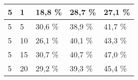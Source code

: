 \begin{table}[!htb]
\begin{tabular}{lllll}
\multicolumn{1}{|l|}{5}                                                      & \multicolumn{1}{l|}{1}                                                                 & \multicolumn{1}{l|}{18,8 \%}                                                                                           & \multicolumn{1}{l|}{28,7 \%}                                                                                            & \multicolumn{1}{l|}{27,1 \%}                                                                                            \\ \hline
\multicolumn{1}{|l|}{5}                                                      & \multicolumn{1}{l|}{5}                                                                 & \multicolumn{1}{l|}{30,6 \%}                                                                                           & \multicolumn{1}{l|}{38,9 \%}                                                                                            & \multicolumn{1}{l|}{41,7 \%}                                                                                            \\ \hline
\multicolumn{1}{|l|}{5}                                                      & \multicolumn{1}{l|}{10}                                                                & \multicolumn{1}{l|}{26,1 \%}                                                                                           & \multicolumn{1}{l|}{40,1 \%}                                                                                            & \multicolumn{1}{l|}{43,3 \%}                                                                                            \\ \hline
\multicolumn{1}{|l|}{5}                                                      & \multicolumn{1}{l|}{15}                                                                & \multicolumn{1}{l|}{30,7 \%}                                                                                           & \multicolumn{1}{l|}{40,7 \%}                                                                                            & \multicolumn{1}{l|}{47,0 \%}                                                                                            \\ \hline
\multicolumn{1}{|l|}{5}                                                      & \multicolumn{1}{l|}{20}                                                                & \multicolumn{1}{l|}{29,2 \%}                                                                                           & \multicolumn{1}{l|}{39,3 \%}                                                                                            & \multicolumn{1}{l|}{45,4 \%}                                                                                            \\ \hline

\end{tabular}
\end{table}
